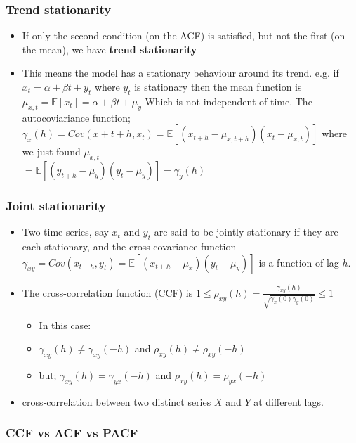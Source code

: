 \documentclass{article}
\begin{document}
\subsubsection{Trend stationarity}
\begin{itemize}
    \item If only the second condition (on the ACF) is satisfied, but not the first (on the mean), we have \textbf{trend stationarity}
    \item This means the model has a stationary behaviour around its trend.
    \subitem e.g. if $x_t = \alpha + \beta t + y_t$ where $y_t$ is stationary
    then the mean function is $\mu_{x,t} = \mathbb{E}[x_t] = \alpha + \beta t + \mu_y$ Which is not independent of time. The autocoviariance function;\\ $\gamma_x(h) = Cov(x+{t+h} , x_t) = \mathbb{E}[(x_{t+h} - \mu_{x,t+h})(x_t - \mu_{x,t})]$ where we just found $\mu_{x,t}$\\
    $ = \mathbb{E}[(y_{t+h} - \mu_y) (y_t - \mu_y)] = \gamma_y(h)$
\end{itemize}


\subsubsection{Joint stationarity}
\begin{itemize}
    \item Two time series, say $x_t$ and $y_t$ are said to be jointly stationary if they are each stationary, and the cross-covariance function $\gamma_{xy} = Cov(x_{t+h},y_t) = \mathbb{E}[(x_{t+h} - \mu_x) (y_t - \mu_y)]$ is a function of lag $h$.
    \item The cross-correlation function (CCF) is $1 \leq \rho_{xy} (h) = \frac{\gamma_{xy}(h)}{\sqrt{\gamma_x(0) \gamma_y(0)}} \leq 1$
    \begin{itemize}
        \item In this case:
        \item $\gamma_{xy}(h) \neq \gamma_{xy}(-h)$ and $\rho_{xy}(h) \neq \rho_{xy}(-h)$
        \item but; $\gamma_{xy}(h) = \gamma_{yx}(-h)$ and $\rho_{xy}(h) = \rho_{yx}(-h)$
    \end{itemize}
    \item cross‐correlation between two distinct series \(X\) and \(Y\) at different lags.
\end{itemize}

\subsubsection{CCF vs ACF vs PACF}
\end{document}
